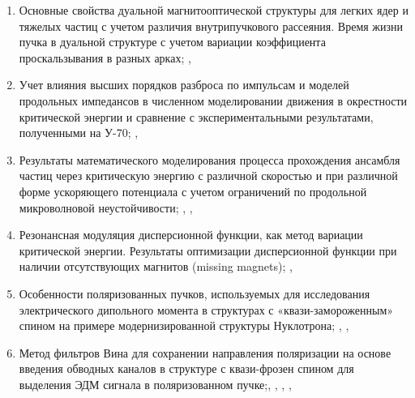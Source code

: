 \par {}
\begin{enumerate}[beginpenalty=10000] %
  \item 	Основные свойства дуальной магнитооптической структуры для легких ядер и тяжелых частиц с учетом различия внутрипучкового рассеяния. Время жизни пучка в дуальной структуре с учетом вариации коэффициента проскальзывания в разных арках; \cite{Kolokolchikov:2025_dual}, \cite{Syresin:2021_polar}
  \item	Учет влияния высших порядков разброса по импульсам и моделей продольных импедансов в численном моделировании движения в окрестности критической энергии и сравнение с экспериментальными результатами, полученными на У-70; \cite{Kolokolchikov:2025_U70}, \cite{Kolokolchikov:2025_jump}
  \item	Результаты математического моделирования процесса прохождения ансамбля частиц через критическую энергию с различной скоростью и при различной форме ускоряющего потенциала с учетом ограничений по продольной микроволновой неустойчивости; \cite{Kolokolchikov:2024_bb_rupac}, \cite{Kolokolchikov:2023_bb_IPAC}, \cite{Kolokolchikov:2024_bb_dspin}
  \item	Резонансная модуляция дисперсионной функции, как метод вариации критической энергии. Результаты оптимизации дисперсионной функции при наличии отсутствующих магнитов (missing magnets); \cite{Kolokolchikov:2021trans}, \cite{Kolokolchikov:2023_pecular}
  \item	Особенности поляризованных пучков, используемых для исследования электрического дипольного момента в структурах с «квази-замороженным» спином на примере модернизированной структуры Нуклотрона; \cite{Senichev:2023_QFS}, \cite{Senichev:2023_nuclotron}, \cite{Kolokolchikov:2025_nuclotron}
  \item	Метод фильтров Вина для сохранении направления поляризации  на основе введения обводных каналов в структуре с квази-фрозен спином для выделения ЭДМ сигнала в поляризованном пучке;\cite{Kolokolchikov:2023_bypass}, \cite{Kolokolchikov:2023_bypass_IPAC}, \cite{Senichev:2024_nica_edm}, \cite{Kolokolchikov:2023_sc}, \cite{Kolokolchikov:2023_sc_IPAC}
\end{enumerate}

